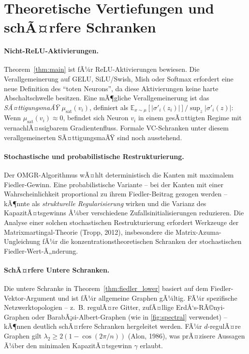 ﻿\documentclass[12pt, a4paper, openany]{report}
\newcommand{\E}{\mathbb{E}}
\begin{document}
\section{Theoretische Vertiefungen und schÃ¤rfere Schranken}
\label{sec:outlook_theory}

\paragraph{Nicht-ReLU-Aktivierungen.}
Theorem~\ref{thm:main} ist fÃ¼r ReLU-Aktivierungen bewiesen.  Die
Verallgemeinerung auf GELU, SiLU/Swish, Mish oder Softmax erfordert
eine neue Definition des ``toten Neurons'', da diese Aktivierungen keine
harte Abschaltschwelle besitzen.  Eine mÃ¶gliche Verallgemeinerung ist das
\emph{SÃ¤ttigungsmaÃŸ} $\mu_{\mathrm{sat}}(v_i)$, definiert als
$\E_{x \sim \mu}[|\sigma'_i(z_i)|] / \sup_{z} |\sigma'_i(z)|$: Wenn
$\mu_{\mathrm{sat}}(v_i) \approx 0$, befindet sich Neuron $v_i$ in einem
gesÃ¤ttigten Regime mit vernachlÃ¤ssigbarem Gradientenfluss.  Formale
VC-Schranken unter diesem verallgemeinerten SÃ¤ttigungsmaÃŸ sind noch
ausstehend.

\paragraph{Stochastische und probabilistische Restrukturierung.}
Der OMGR-Algorithmus wÃ¤hlt deterministisch die Kanten mit maximalem
Fiedler-Gewinn.  Eine probabilistische Variante -- bei der Kanten mit
einer Wahrscheinlichkeit proportional zu ihrem Fiedler-Beitrag gezogen
werden -- kÃ¶nnte als \emph{strukturelle Regularisierung} wirken und
die Varianz des KapazitÃ¤tsgewinns Ã¼ber verschiedene Zufallsinitialisierungen
reduzieren.  Die Analyse einer solchen stochastischen Restrukturierung
erfordert Werkzeuge der Matrixmartingal-Theorie (Tropp, 2012), insbesondere
die Matrix-Azuma-Ungleichung fÃ¼r die konzentrationstheoretischen
Schranken der stochastischen Fiedler-Wert-Ã„nderung.

\paragraph{SchÃ¤rfere Untere Schranken.}
Die untere Schranke in Theorem~\ref{thm:fiedler_lower} basiert auf dem
Fiedler-Vektor-Argument und ist fÃ¼r allgemeine Graphen gÃ¼ltig.  FÃ¼r
spezifische Netzwerktopologien -- z.~B. regulÃ¤re Gitter, zufÃ¤llige
ErdÅ‘s-RÃ©nyi-Graphen oder BarabÃ¡si-Albert-Graphen (wie in
\cref{fig:spectral} verwendet) -- kÃ¶nnen deutlich schÃ¤rfere
Schranken hergeleitet werden.  FÃ¼r $d$-regulÃ¤re Graphen gilt
$\lambda_2 \geq 2(1 - \cos(2\pi/n))$ (Alon, 1986), was prÃ¤zisere
Aussagen Ã¼ber den minimalen KapazitÃ¤tsgewinn $\gamma$ erlaubt.
\end{document}
